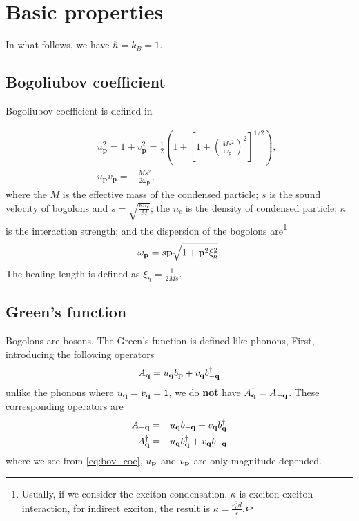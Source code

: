\chapter{Basic properties}
In what follows, we have $\hbar = k_B=1$.

\section{Bogoliubov coefficient}\label{sec:BovCoef}
Bogoliubov coefficient is defined in~\cite{giorgini:98di}

\begin{eqnarray}\label{eq:bov_coe}
&&u^2_{\mathbf{p}}=1+v^2_{\mathbf{p}}=\frac{1}{2}\left(1+\left[1+\left(\frac{Ms^2}{\omega_{\mathbf{p}}}\right)^2\right]^{1/2}\right),
\\
&&u_{\mathbf{p}}v_{\mathbf{p}}=-\frac{Ms^2}{2\omega_{\mathbf{p}}},
\end{eqnarray}
where the $M$ is the effective mass of the condensed particle; $s$ is the sound velocity of bogolons and $s= \sqrt{\frac{\kappa n_c}{M}}$; the $n_c$ is the density of condensed particle; $\kappa$ is the interaction strength; and the dispersion of the bogolons are\footnote{
Usually, if we consider the exciton condensation, $\kappa$ is exciton-exciton interaction, for indirect exciton, the result is $\kappa = \frac{e_0^2 d}{\epsilon}$.
}
%
\begin{equation}\label{eq:bov_disp}
  \omega_{\mathbf{p}} = s\mathbf{p} \sqrt{1+\mathbf{p}^2 \xi_h^2}.
\end{equation}
The healing length is defined as $\xi_h=\frac{1}{2Ms}$.

\section{Green's function}\label{sec:Green}
Bogolons are bosons.
The Green's function is defined like phonons,
First, introducing the following operators
\begin{equation}\label{eq:Aq}
  A_{\mathbf{q}} = u_{\mathbf{q}} b_{\mathbf{p}} + v_{\mathbf{q}} b^\dagger_{-\mathbf{q}}
\end{equation}
unlike the phonons where $u_{\mathbf{q}} =v_{\mathbf{q}}=1$, we do \textbf{not} have $A_{\mathbf{q}}^\dagger = A_{-\mathbf{q}}$.
These corresponding operators are
\begin{eqnarray}
  A_{-\mathbf{q}} &=& u_{\mathbf{q}} b_{-\mathbf{q}} + v_{\mathbf{q}} b^\dagger_{\mathbf{q}} \label{eq:Aq1} \\
  A_{\mathbf{q}}^\dagger &=& u_{\mathbf{q}} b_{\mathbf{q}}^\dagger + v_{\mathbf{q}} b_{-\mathbf{q}} \label{eq:Aq2}
\end{eqnarray}
where we see from \eqref{eq:bov_coe}, $u_{\mathbf{p}}$ and $v_{\mathbf{p}}$ are only magnitude depended.

